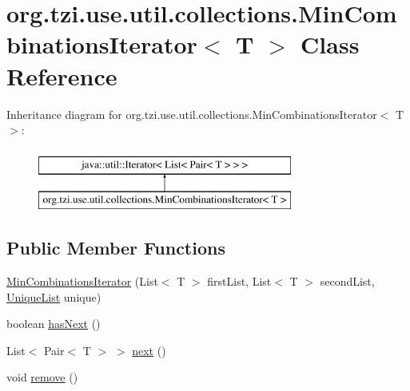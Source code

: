 \hypertarget{classorg_1_1tzi_1_1use_1_1util_1_1collections_1_1_min_combinations_iterator_3_01_t_01_4}{\section{org.\-tzi.\-use.\-util.\-collections.\-Min\-Combinations\-Iterator$<$ T $>$ Class Reference}
\label{classorg_1_1tzi_1_1use_1_1util_1_1collections_1_1_min_combinations_iterator_3_01_t_01_4}
}
Inheritance diagram for org.\-tzi.\-use.\-util.\-collections.\-Min\-Combinations\-Iterator$<$ T $>$\-:\begin{figure}[H]
\begin{center}
\leavevmode
\includegraphics[height=2.000000cm]{classorg_1_1tzi_1_1use_1_1util_1_1collections_1_1_min_combinations_iterator_3_01_t_01_4}
\end{center}
\end{figure}
\subsection*{Public Member Functions}
\begin{DoxyCompactItemize}
\item 
\hyperlink{classorg_1_1tzi_1_1use_1_1util_1_1collections_1_1_min_combinations_iterator_3_01_t_01_4_abee9ca3e7e346a4e0fd30cdb2cdbe2f3}{Min\-Combinations\-Iterator} (List$<$ T $>$ first\-List, List$<$ T $>$ second\-List, \hyperlink{enumorg_1_1tzi_1_1use_1_1util_1_1collections_1_1_collection_util_1_1_unique_list}{Unique\-List} unique)
\item 
boolean \hyperlink{classorg_1_1tzi_1_1use_1_1util_1_1collections_1_1_min_combinations_iterator_3_01_t_01_4_ac747dea0d0d64f04a0304208dd24e670}{has\-Next} ()
\item 
List$<$ Pair$<$ T $>$ $>$ \hyperlink{classorg_1_1tzi_1_1use_1_1util_1_1collections_1_1_min_combinations_iterator_3_01_t_01_4_a952572a38dfe6b843ffdda06c1691c06}{next} ()
\item 
void \hyperlink{classorg_1_1tzi_1_1use_1_1util_1_1collections_1_1_min_combinations_iterator_3_01_t_01_4_a8d9ea02840d314128be9094142d2d82b}{remove} ()
\end{DoxyCompactItemize}



